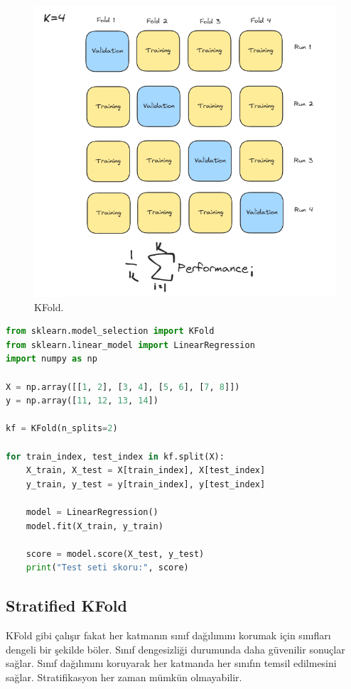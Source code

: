\begin{figure}[h]
    \centering
    \includegraphics[width=1\textwidth]{images/kfold_structure.png}
    \caption{KFold.}
    \label{fig:enter-label}
\end{figure}

\begin{lstlisting}[language=Python, caption=Scikit-learn'de KFold örneği.]
from sklearn.model_selection import KFold
from sklearn.linear_model import LinearRegression
import numpy as np

X = np.array([[1, 2], [3, 4], [5, 6], [7, 8]])
y = np.array([11, 12, 13, 14])

kf = KFold(n_splits=2)

for train_index, test_index in kf.split(X):
    X_train, X_test = X[train_index], X[test_index]
    y_train, y_test = y[train_index], y[test_index]
    
    model = LinearRegression()
    model.fit(X_train, y_train)
    
    score = model.score(X_test, y_test)
    print("Test seti skoru:", score)
\end{lstlisting}

\subsection{Stratified KFold}
KFold gibi çalışır fakat her katmanın sınıf dağılımını korumak için sınıfları dengeli bir şekilde böler. Sınıf dengesizliği durumunda daha güvenilir sonuçlar sağlar. Sınıf dağılımını koruyarak her katmanda her sınıfın temsil edilmesini sağlar. Stratifikasyon her zaman mümkün olmayabilir.

